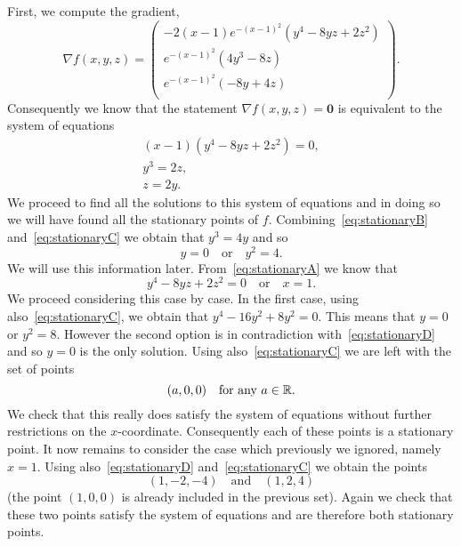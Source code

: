 \begin{solution}
    First, we compute the gradient,
    \[
        \nabla f(x,y,z) =  \left(
        \begin{array}{c}
                -2(x-1)e^{-{(x-1)}^2}(y^4 - 8yz + 2z^2) \\
                e^{-{(x-1)}^2}(4y^{3} - 8 z)            \\
                e^{-{(x-1)}^2}(-8 y + 4 z)              \\
            \end{array}
        \right).
    \]
    Consequently we know that the statement \(\nabla f(x,y,z) = \mathbf{0}\) is equivalent to the system of equations
    \begin{gather}
        (x-1)(y^4 - 8yz + 2z^2) = 0, \label{eq:stationaryA}\\
        y^3 = 2z,  \label{eq:stationaryB}\\
        z = 2y.    \label{eq:stationaryC}
    \end{gather}
    We proceed to find all the solutions to this system of equations and in doing so we will have found all the stationary points of \(f\).
    Combining~\eqref{eq:stationaryB} and~\eqref{eq:stationaryC} we obtain that \(y^3 = 4y\) and so
    \begin{equation}
        \label{eq:stationaryD}
        y = 0 \quad \text{or} \quad y^2 = 4.
    \end{equation}
    We will use this information later.
    From~\eqref{eq:stationaryA} we know that
    \[
        y^4 - 8yz + 2z^2 = 0
        \quad \text{or} \quad
        x = 1.
    \]
    We proceed considering this case by case.
    In the first case, using also~\eqref{eq:stationaryC}, we obtain that \(y^4 - 16 y^2 + 8y^2 = 0\).
    This means that \(y=0\) or \(y^2 = 8\).
    However the second option is in contradiction with~\eqref{eq:stationaryD} and so \(y=0\) is the only solution.
    Using also~\eqref{eq:stationaryC} we are left with the set of points
    \[
        (a,0,0) \quad \text{for any \(a\in\mathbb{R}\)}.
    \]
    We check that this really does satisfy the system of equations without further restrictions on the \(x\)-coordinate.
    Consequently each of these points is a stationary point.
    It now remains to consider the case which previously we ignored, namely \(x=1\).
    Using also~\eqref{eq:stationaryD} and~\eqref{eq:stationaryC} we obtain the points
    \[
        (1,-2,-4)
        \quad \text{and} \quad
        (1,2,4)
    \]
    (the point \((1,0,0)\) is already included in the previous set).
    Again we check that these two points satisfy the system of equations and are therefore both stationary points.


\end{solution}
